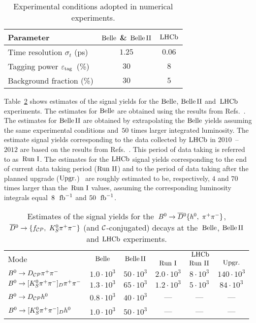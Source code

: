 \documentclass[a4paper,11pt]{article}
\begin{document}
\begin{table}
 \centering
 \caption{Experimental conditions adopted in numerical experiments.}
 \label{tab:conditions}
 \begin{tabular}{lcc}
 \hline\hline
 Parameter                         & $\mathrm{Belle}$ \& $\mathrm{Belle}\,\mathrm{II}$ & $\mathrm{LHCb}$ \\ \hline
 Time resolution $\sigma_t$ (ps)   & $1.25$                 & $0.06$ \\
 Tagging power $\varepsilon_{\mathrm{tag}}$\ (\%)       & $30$                   & $8$ \\
 Background fraction (\%)          & $30$                   & $5$ \\
 \hline\hline
 \end{tabular}
\end{table}

Table~\ref{tab:yield} shows estimates of the signal yields for the $\mathrm{Belle}$, 
$\mathrm{Belle}\,\mathrm{II}$ and~$\mathrm{LHCb}$ experiments.  The estimates for $\mathrm{Belle}$ are obtained 
using the results from Refs.~\cite{bdpp_belle,cosbeta_belle,sinbeta_bcud}.  The 
estimates for $\mathrm{Belle}\,\mathrm{II}$ are obtained by extrapolating the $\mathrm{Belle}$ 
yields assuming the same experimental conditions and~$50$ times larger 
integrated luminosity.  The estimate signal yields corresponding to the 
data collected by $\mathrm{LHCb}$ in $2010$~--~$2012$  are based on the results from 
Refs.~\cite{bdpp_lhcb,bdk_lhcb,bdk_kspp_lhcb}.  This period of data taking is 
referred to as~$\mathrm{Run\ I}$.  The estimates for the $\mathrm{LHCb}$ signal yields 
corresponding to the end of current data taking period ($\mathrm{Run\ II}$) 
and to the period of data taking after the planned upgrade ($\mathrm{Upgr.}$)~\cite{lhcb_upgr}
are roughly estimated to be, respectively, $4$ and $70$ times larger 
than the~$\mathrm{Run\ I}$ values, assuming the corresponding luminosity integrals 
equal~$8~~\mathrm{fb}^{-1}$ and $50~~\mathrm{fb}^{-1}$.

\begin{table}
 \centering
 \caption{Estimates of the signal yields for the~$B^0\to \overline{D}{}^0\{h^0,\ \pi^+\pi^-\}$, 
 $\overline{D}{}^0\to\{f_{\mathcal{CP}},\ K_S^0\pi^+\pi^-\}$ (and $\mathcal{C}$-conjugated) decays at 
 the~$\mathrm{Belle}$, $\mathrm{Belle}\,\mathrm{II}$ and $\mathrm{LHCb}$ experiments.}
 \label{tab:yield}
\begin{tabular}{lccccc}
 \hline\hline
\multirow{2}{*}{Mode} & \multirow{2}{*}{$\mathrm{Belle}$}  & \multirow{2}{*}{$\mathrm{Belle}\,\mathrm{II}$} 
             & \multicolumn{3}{c}{$\mathrm{LHCb}$} \\
             &   & & $\mathrm{Run\ I}$ & $\mathrm{Run\ II}$ & $\mathrm{Upgr.}$ \\
 \hline
 $B^0\to D_{\mathcal{CP}}\pi^+\pi^-$    & $1.0\cdot10^3$ & $50 \cdot10^3$ & $2.0\cdot10^3$ & $8\cdot10^3$ & $140\cdot10^3$ \\
 $B^0\to [K_S^0\pi^+\pi^-]_{D}\pi^+\pi^-$  & $1.3\cdot10^3$ & $65 \cdot10^3$ & $1.2\cdot10^3$ & $5\cdot10^3$ & $84 \cdot10^3$ \\
 $B^0\to D_{\mathcal{CP}} h^0$     & $0.8\cdot10^3$ & $40 \cdot10^3$ & --- & --- & --- \\
 $B^0\to [K_S^0\pi^+\pi^-]_{D} h^0$   & $1.0\cdot10^3$ & $50 \cdot10^3$ & --- & --- & --- \\
 \hline\hline
 \end{tabular}
\end{table}
\end{document}
